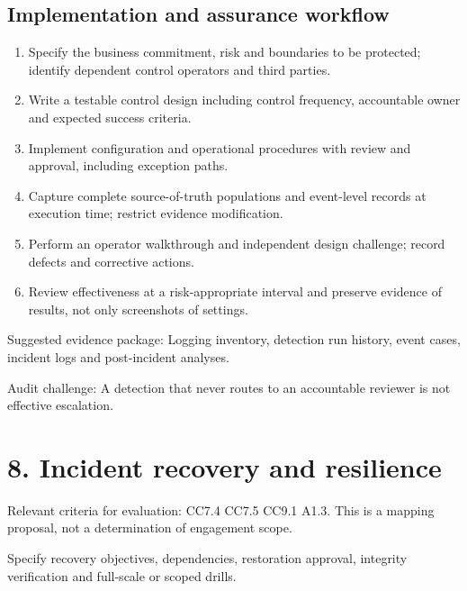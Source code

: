 \documentclass[10pt,oneside]{report}
\begin{document}
\subsection{Implementation and assurance workflow}
\begin{enumerate}
\item Specify the business commitment, risk and boundaries to be protected; identify dependent control operators and third parties.
\item Write a testable control design including control frequency, accountable owner and expected success criteria.
\item Implement configuration and operational procedures with review and approval, including exception paths.
\item Capture complete source-of-truth populations and event-level records at execution time; restrict evidence modification.
\item Perform an operator walkthrough and independent design challenge; record defects and corrective actions.
\item Review effectiveness at a risk-appropriate interval and preserve evidence of results, not only screenshots of settings.
\end{enumerate}

Suggested evidence package: Logging inventory, detection run history, event cases, incident logs and post-incident analyses.

Audit challenge: A detection that never routes to an accountable reviewer is not effective escalation.

\section{8. Incident recovery and resilience}
Relevant criteria for evaluation: CC7.4 CC7.5 CC9.1 A1.3. This is a mapping proposal, not a determination of engagement scope.

\begin{engineeringbox}
Specify recovery objectives, dependencies, restoration approval, integrity verification and full-scale or scoped drills.
\end{engineeringbox}
\end{document}
